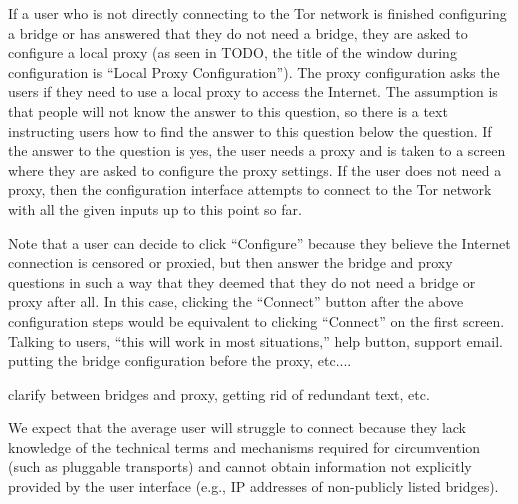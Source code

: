 \documentclass{template}
\begin{document}
If a user who is not directly connecting to the Tor network is finished configuring
a bridge or has answered that they do not need a bridge, they are asked to 
configure a local proxy (as seen in {\color {red} TODO}, the title of the window during %
configuration is ``Local Proxy Configuration''). The proxy configuration asks the 
users if they need to use a local proxy to access the Internet. The assumption 
is that people will not know the answer to this question, so there is a text instructing
users how to find the answer to this question below the question. If the answer to
the question is yes, the user needs a proxy and is taken to a screen where they are
asked to configure the proxy settings. If the user does not need a proxy, then the 
configuration interface attempts to connect to the Tor network with all the 
given inputs up to this point so far. 

Note that a user can decide to click ``Configure'' because they believe the 
Internet connection is censored or proxied, but then answer the bridge and proxy
questions in such a way that they deemed that they do not need a bridge or proxy 
after all. In this case, clicking the ``Connect'' button after the above configuration steps
would be equivalent to clicking ``Connect'' on the first screen. \\ 


{\color {red} 
Talking to users, ``this will work in most situations,'' help button, support email.
putting the bridge configuration before the proxy, etc.... \\
}

{\color {red} 
clarify between bridges and proxy, getting rid of redundant text, etc.  \\
}

 We expect that the average user will
struggle to connect because they lack knowledge of the technical terms and
mechanisms required for circumvention (such as pluggable transports) and cannot
obtain information not explicitly provided by the user interface (e.g., IP
addresses of non-publicly listed bridges).
\end{document}

